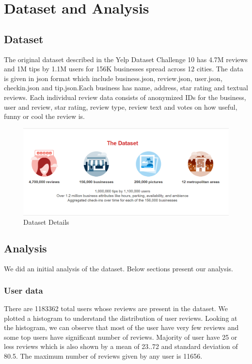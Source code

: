\documentclass[11pt]{article}
\begin{document}
	\bigskip
	
	
	\section{Dataset and Analysis} 
		\subsection{Dataset}
		 The original dataset described in the Yelp Dataset Challenge 10 \cite{yelp} has 4.7M reviews and 1M tips by 1.1M users for 156K businesses spread across 12 cities. The 	data is given in json format which include business.json, review.json, user.json, checkin.json and tip.json.Each business has name, address, star rating and textual reviews. Each individual review data consists of anonymized IDs for the business, user and review, star rating, review type, review text and votes on how useful, funny or cool the review is.
		\begin{figure}[H]
				\centering
				\includegraphics[scale=0.5]{data_details.png}
				\caption{Dataset Details}
		\end{figure}
		\subsection{Analysis}
		We did an initial analysis of the dataset. Below sections present our analysis.
			\subsubsection{User data}
			There are 1183362 total users whose reviews are present in the dataset. We plotted a histogram to understand the distribution of user reviews. Looking at the histogram, we can observe that most of the user have very few reviews and some top users have significant number of reviews. Majority of user have 25 or less reviews which is also shown by a mean of 23..72 and standard deviation of 80.5. The maximum number of reviews given by any user is 11656.
		
\end{document}
